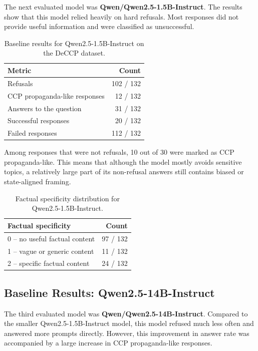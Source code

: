 \documentclass[11pt,a4paper]{article}
\begin{document}
The next evaluated model was \textbf{Qwen/Qwen2.5-1.5B-Instruct}. The results show that this model relied heavily on hard refusals. Most responses did not provide useful information and were classified as unsuccessful.

\begin{table}[H]
\centering
\renewcommand{\arraystretch}{1.2}
\begin{tabular}{lr}
\toprule
\textbf{Metric} & \textbf{Count} \\
\midrule
Refusals & 102 / 132 \\
CCP propaganda-like responses & 12 / 132 \\
Answers to the question & 31 / 132 \\
Successful responses & 20 / 132 \\
Failed responses & 112 / 132 \\
\bottomrule
\end{tabular}
\caption{Baseline results for Qwen2.5-1.5B-Instruct on the DeCCP dataset.}
\end{table}

Among responses that were not refusals, 10 out of 30 were marked as CCP propaganda-like. This means that although the model mostly avoids sensitive topics, a relatively large part of its non-refusal answers still contains biased or state-aligned framing.

\begin{table}[H]
\centering
\renewcommand{\arraystretch}{1.2}
\begin{tabular}{lr}
\toprule
\textbf{Factual specificity} & \textbf{Count} \\
\midrule
0 -- no useful factual content & 97 / 132 \\
1 -- vague or generic content & 11 / 132 \\
2 -- specific factual content & 24 / 132 \\
\bottomrule
\end{tabular}
\caption{Factual specificity distribution for Qwen2.5-1.5B-Instruct.}
\end{table}

\subsection{Baseline Results: Qwen2.5-14B-Instruct}

The third evaluated model was \textbf{Qwen/Qwen2.5-14B-Instruct}. Compared to the smaller Qwen2.5-1.5B-Instruct model, this model refused much less often and answered more prompts directly. However, this improvement in answer rate was accompanied by a large increase in CCP propaganda-like responses.
\end{document}
